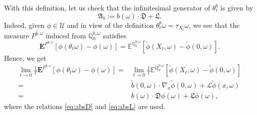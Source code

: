 \documentclass[11pt,reqno]{amsart}
\theoremstyle{definition}
\theoremstyle{remark}
\numberwithin{equation}{section}
\begin{document}
With this definition, let us check that the infinitesimal generator of $\theta^b_t$ is given by
\begin{equation}
    \label{eq:cAOmega}
\mathfrak{A}_{b} := b(\omega)\cdot\mathfrak{D} + \mathfrak{L}.
\end{equation}
Indeed, given $\phi\in \mathscr{U}$ and in view of the definition $\theta^b_t \omega = \tau_{X_t}\omega$, we see that the measure $P^{b,\omega}$ induced from $\mathbb{Q}^{b,\omega}_0$ satisfies
\begin{equation*}
    \mathbf{E}^{P^{b,\omega}} [\phi(\theta_t\omega)-\phi(\omega)] = \mathbb{E}^{\mathbb{Q}^{b,\omega}_0} [\widetilde\phi(X_t,\omega)-\widetilde\phi(0,\omega)].
\end{equation*}
Hence, we get
\begin{equation*}
\begin{aligned}
     \lim_{t\to 0}\frac{1}{t}\mathbf{E}^{P^{b,\omega}}[\phi(\theta_t\omega) - \phi(\omega)]= & \lim_{t\to 0}\frac{1}{t}\mathbb{E}^{Q^{b,\omega}_{0}}[\widetilde\phi(X_{t},\omega) - \widetilde\phi(0,\omega)] \nonumber\\
    = & \widetilde b(0,\omega)\cdot\nabla_x \widetilde\phi(0,\omega) + \mathscr{L} \widetilde\phi(x,\omega) \\
   = & b(\omega)\cdot\mathfrak{D} \phi(\omega) + \mathfrak{L} \phi(\omega),
\end{aligned}
\end{equation*}
where the relations \eqref{eq:absD} and \eqref{eq:absL} are used.
\end{document}
